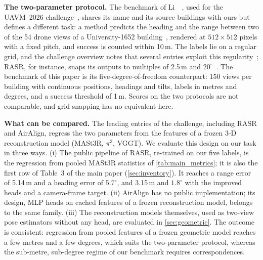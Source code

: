 \documentclass[10pt,twocolumn,letterpaper]{article}
\begin{document}
\noindent\textbf{The two-parameter protocol.} The benchmark of Li~\etal~\cite{li2026lastmeter}, used for the UAVM~2026 challenge~\cite{deuser2026uavm}, shares its name and its source buildings with ours but defines a different task: a method predicts the heading and the range between two of the 54 drone views of a University-1652 building~\cite{zheng2020university}, rendered at $512{\times}512$ pixels with a fixed pitch, and success is counted within 10\,m. The labels lie on a regular grid, and the challenge overview notes that several entries exploit this regularity~\cite{deuser2026uavm}; RASR, for instance, snaps its outputs to multiples of 2.5\,m and $20^\circ$~\cite{liang2026rasr}. The benchmark of this paper is its five-degree-of-freedom counterpart: 150 views per building with continuous positions, headings and tilts, labels in metres and degrees, and a success threshold of 1\,m. Scores on the two protocols are not comparable, and grid snapping has no equivalent here.

\noindent\textbf{What can be compared.} The leading entries of the challenge, including RASR and AirAlign, regress the two parameters from the features of a frozen 3-D reconstruction model (MASt3R, $\pi^3$, VGGT). We evaluate this design on our task in three ways. (i) The public pipeline of RASR, re-trained on our five labels, is the regression from pooled MASt3R statistics of \cref{tab:main_metrics}; it is also the first row of Table~3 of the main paper (\cref{sec:inventory}). It reaches a range error of 5.14\,m and a heading error of $5.7^\circ$, and 3.15\,m and $1.8^\circ$ with the improved heads and a camera-frame target. (ii) AirAlign has no public implementation; its design, MLP heads on cached features of a frozen reconstruction model, belongs to the same family. (iii) The reconstruction models themselves, used as two-view pose estimators without any head, are evaluated in \cref{sec:geometric}. The outcome is consistent: regression from pooled features of a frozen geometric model reaches a few metres and a few degrees, which suits the two-parameter protocol, whereas the sub-metre, sub-degree regime of our benchmark requires correspondences.
\end{document}
